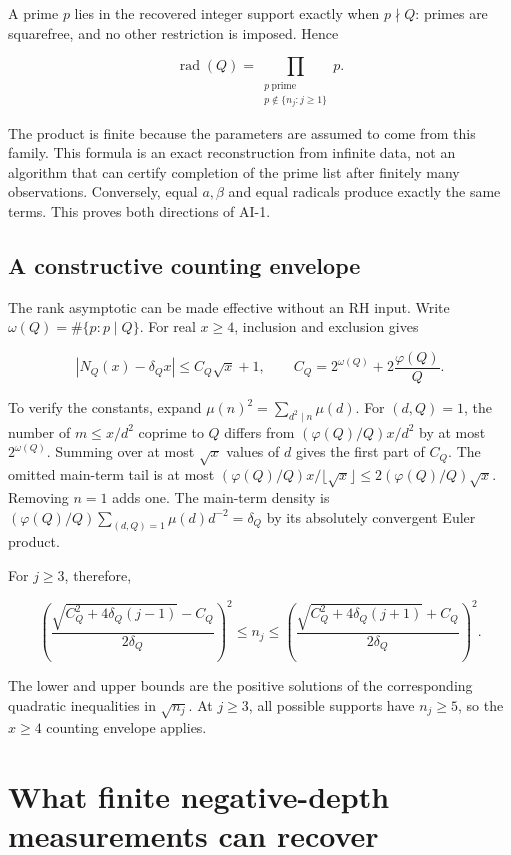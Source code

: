 A prime \(p\) lies in the recovered integer support exactly when
\(p\nmid Q\): primes are squarefree, and no other restriction is
imposed. Hence

\[
 \boxed{\displaystyle
 \operatorname{rad}(Q)=\prod_{\substack{p\ \mathrm{prime}\\
                                      p\notin\{n_j:j\ge1\}}}p.}
\]

The product is finite because the parameters are assumed to come from
this family. This formula is an exact reconstruction from infinite data,
not an algorithm that can certify completion of the prime list after
finitely many observations. Conversely, equal \(a,\beta\) and equal
radicals produce exactly the same terms. This proves both directions of
AI-1.

\hypertarget{a-constructive-counting-envelope}{%
\subsection{A constructive counting
envelope}\label{a-constructive-counting-envelope}}

The rank asymptotic can be made effective without an RH input. Write
\(\omega(Q)=\#\{p:p\mid Q\}\). For real \(x\ge4\), inclusion and
exclusion gives

\[
 |N_Q(x)-\delta_Qx|\le C_Q\sqrt x+1,
 \qquad C_Q=2^{\omega(Q)}+2\frac{\varphi(Q)}Q.
\]

To verify the constants, expand \(\mu(n)^2=\sum_{d^2\mid n}\mu(d)\). For
\((d,Q)=1\), the number of \(m\le x/d^2\) coprime to \(Q\) differs from
\((\varphi(Q)/Q)x/d^2\) by at most \(2^{\omega(Q)}\). Summing over at
most \(\sqrt x\) values of \(d\) gives the first part of \(C_Q\). The
omitted main-term tail is at most
\((\varphi(Q)/Q)x/\lfloor\sqrt x\rfloor\le2(\varphi(Q)/Q)\sqrt x\).
Removing \(n=1\) adds one. The main-term density is
\((\varphi(Q)/Q)\sum_{(d,Q)=1}\mu(d)d^{-2}=\delta_Q\) by its absolutely
convergent Euler product.

For \(j\ge3\), therefore,

\[
 \left(\frac{\sqrt{C_Q^2+4\delta_Q(j-1)}-C_Q}{2\delta_Q}\right)^2
 \le n_j\le
 \left(\frac{\sqrt{C_Q^2+4\delta_Q(j+1)}+C_Q}{2\delta_Q}\right)^2.
\]

The lower and upper bounds are the positive solutions of the
corresponding quadratic inequalities in \(\sqrt{n_j}\). At \(j\ge3\),
all possible supports have \(n_j\ge5\), so the \(x\ge4\) counting
envelope applies.

\hypertarget{what-finite-negative-depth-measurements-can-recover}{%
\section{What finite negative-depth measurements can
recover}\label{what-finite-negative-depth-measurements-can-recover}}


